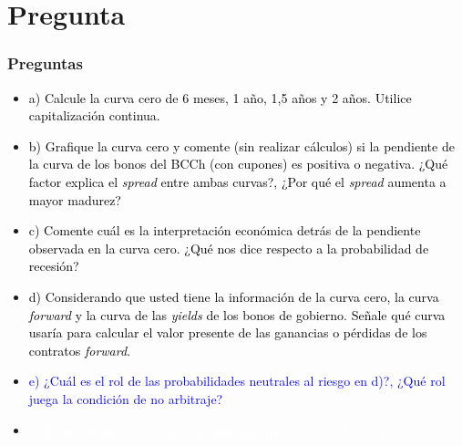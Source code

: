 \documentclass{beamer}
\begin{document}
\section{Pregunta }

\begin{frame}
  \frametitle{Preguntas}
  \begin{itemize}
    \scriptsize
    \item {\textcolor{black}{a) Calcule la curva cero de 6 meses, 1 año, 1,5 años y 2 años. Utilice capitalización continua.}}
    \vspace{3pt}
    \item {\textcolor{black}{b) Grafique la curva cero y comente (sin realizar cálculos) si la pendiente de la curva de los bonos del BCCh (con cupones) es positiva o negativa. ¿Qué factor explica el \textit{spread} entre ambas curvas?, ¿Por qué el \textit{spread} aumenta a mayor madurez?}}
    \vspace{3pt}
    \item {\textcolor{black}{c) Comente cuál es la interpretación económica detrás de la pendiente observada en la curva cero. ¿Qué nos dice respecto a la probabilidad de recesión?}}
    \vspace{3pt}
    \item {\textcolor{black}{d) Considerando que usted tiene la información de la curva cero, la curva \textit{forward} y la curva de las \textit{yields} de los bonos de gobierno. Señale qué curva usaría para calcular el valor presente de las ganancias o pérdidas de los contratos \textit{forward}.}}
    \vspace{3pt}
    \item {\Large\textcolor{blue}{e) ¿Cuál es el rol de las probabilidades neutrales al riesgo en d)?, ¿Qué rol juega la condición de no arbitraje?}}
    \vspace{3pt}
    \item {\textcolor{white}{f) Realice el punto a) y b)  utilizando matrices en Excel/R/Python.}}
    \vspace{3pt}
  \end{itemize}
\end{frame}
\end{document}
